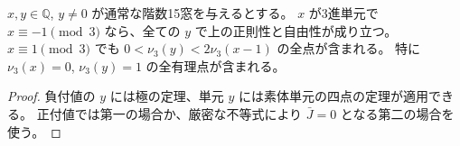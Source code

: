 \begin{corollary}
$x,y\in\mathbb Q$, $y\ne0$ が通常な階数15窓を与えるとする。
$x$ が3進単元で $x\equiv-1\pmod3$ なら、全ての $y$ で上の正則性と自由性が成り立つ。
$x\equiv1\pmod3$ でも $0<\nu_3(y)<2\nu_3(x-1)$ の全点が含まれる。
特に $\nu_3(x)=0$, $\nu_3(y)=1$ の全有理点が含まれる。
\end{corollary}
\begin{proof}
負付値の $y$ には極の定理、単元 $y$ には素体単元の四点の定理が適用できる。
正付値では第一の場合か、厳密な不等式により $\bar J=0$ となる第二の場合を使う。
\end{proof}
